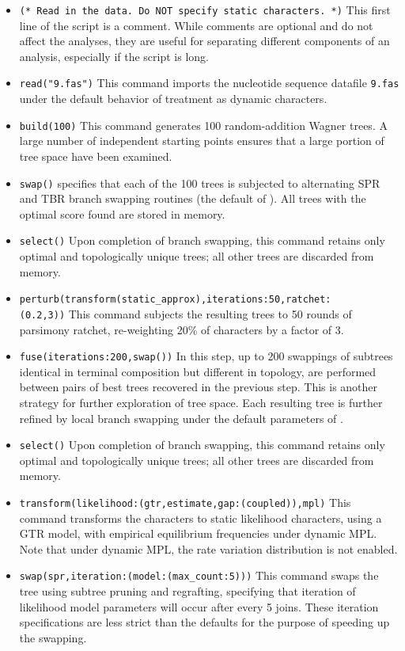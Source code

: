 \begin{itemize}
\item \texttt{(* Read in the data. Do NOT specify static characters. *)} This first line of the script is a comment. While comments are optional and do not affect the analyses, they are useful for separating different components of an analysis, especially if the script is long.
\item \texttt{read("9.fas")}
This command imports the nucleotide sequence datafile \texttt{9.fas} under the default behavior of treatment as dynamic characters.
\item \texttt{build(100)} This command generates 100 random-addition Wagner trees. A large number of independent starting points ensures that a large portion of tree space have been examined.
\item \texttt{swap()}  specifies that each of the 100 trees is subjected to alternating SPR and TBR branch swapping routines (the default of \poy). All trees with the optimal score found are stored in memory.
\item \texttt{select()} Upon completion of branch swapping, this command retains only optimal and topologically unique trees; all other trees are discarded from memory. 
\item \texttt{perturb(transform(static\_approx),iterations:50,ratchet:\\(0.2,3))} This command subjects the resulting trees to 50 rounds of parsimony ratchet, re-weighting 20\% of characters by a factor of 3.
\item \texttt{fuse(iterations:200,swap())} In this step, up to 200 swappings of subtrees identical in terminal composition but different in topology, are performed between pairs of best trees recovered in the previous step. This is another strategy for further exploration of tree space. Each resulting tree is further refined by local branch swapping under the default parameters of .
\item \texttt{select()} Upon completion of branch swapping, this command retains only optimal and topologically unique trees; all other trees are discarded from memory.
\item \texttt{transform(likelihood:(gtr,estimate,gap:(coupled)),mpl)} This command transforms the characters to static likelihood characters, using a GTR model, with empirical equilibrium frequencies under dynamic MPL. Note that under dynamic MPL, the rate variation distribution is not enabled.
\item \texttt{swap(spr,iteration:(model:(max\_count:5)))} This command swaps the tree using subtree pruning and regrafting, specifying that iteration of likelihood model parameters will occur after every 5 joins. These iteration specifications are less strict than the defaults for the purpose of speeding up the swapping.

\end{itemize}
